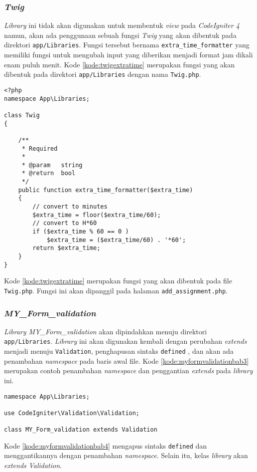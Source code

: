 \subsubsection{\textit{Twig}}
\textit{Library} ini tidak akan digunakan untuk membentuk \textit{view} pada \textit{CodeIgniter 4} namun, akan ada penggunaan sebuah fungsi \textit{Twig} yang akan dibentuk pada direktori \texttt{app/Libraries}. Fungsi tersebut bernama \texttt{extra\_time\_formatter} yang memiliki fungsi untuk mengubah input yang diberikan menjadi format jam dikali enam puluh menit. Kode \ref{kode:twigextratime} merupakan fungsi yang akan dibentuk pada direktori \texttt{app/Libraries} dengan nama \texttt{Twig.php}.
\begin{lstlisting}[caption=Perancangan perubahan \textit{library MY\_Form\_validation} pada \textit{CodeIgniter 4}, label=kode:twigextratime]
<?php
namespace App\Libraries;

class Twig
{

	/**
	 * Required
	 *
	 * @param	string
	 * @return	bool
	 */
	public function extra_time_formatter($extra_time)
	{
		// convert to minutes
		$extra_time = floor($extra_time/60);
		// convert to H*60
		if ($extra_time % 60 == 0 )
			$extra_time = ($extra_time/60) . '*60';
		return $extra_time;
	}
}

\end{lstlisting}

Kode \ref{kode:twigextratime} merupakan fungsi yang akan dibentuk pada file \texttt{Twig.php}. Fungsi ini akan dipanggil pada halaman \texttt{add\_assignment.php}.

\subsubsection{\textit{MY\_Form\_validation}}
\textit{Library MY\_Form\_validation} akan dipindahkan menuju direktori \texttt{app/Libraries}. \textit{Library} ini akan digunakan kembali dengan perubahan \textit{extends} menjadi menuju \texttt{Validation}, penghapusan sintaks \texttt{defined} , dan akan ada penambahan \textit{namespace} pada baris awal file. Kode \ref{kode:myformvalidationbab3} merupakan contoh penambahan \textit{namespace} dan penggantian \textit{extends} pada \textit{library} ini.
\begin{lstlisting}[caption=Contoh perubahan \textit{library MY\_Form\_validation} pada \textit{CodeIgniter 4}, label=kode:myformvalidationbab4]
namespace App\Libraries;

use CodeIgniter\Validation\Validation;

class MY_Form_validation extends Validation
\end{lstlisting}
Kode \ref{kode:myformvalidationbab4} mengapus sintaks \texttt{defined} dan menggantikannya dengan penambahan \textit{namespace}. Selain itu, kelas \textit{library} akan \textit{extends} \textit{Validation}.

